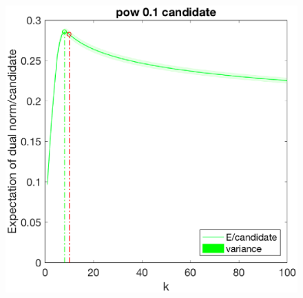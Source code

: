 \documentclass[12pt]{article}
\begin{document}
\begin{figure}[h]
\begin{minipage}[c]{.3\linewidth}
    \end{minipage}
    \hfill%
    \begin{minipage}[c]{.3\linewidth}
        \centering
        \includegraphics[width=\linewidth]{Fig/dualnorm-u0rand-k0-10-candidatepow.eps}
    \end{minipage}
\end{figure}
\end{document}

